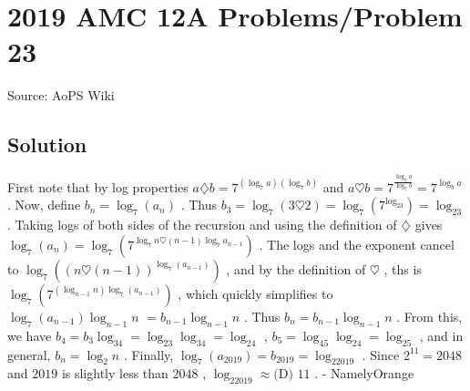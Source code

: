 \documentclass[12pt]{article}
\begin{document}
\section*{{2019 AMC 12A Problems/Problem 23}}
Source: AoPS Wiki

\subsection*{Solution}
First note that by log properties $a\diamondsuit b = 7^{(\log_7a)(\log_7b)}$ and $a \heartsuit b = 7^{\frac{\log_7a}{\log_7b}} = 7^{\log_ba}$ . Now, define $b_n = \log_7(a_n)$ . Thus $b_3 = \log_7(3\heartsuit 2) = \log_7(7^{\log_23}) = \log_23$ . Taking logs of both sides of the recursion and using the definition of $\diamondsuit$ gives $\log_7(a_n) = \log_7(7^{\log_7n\heartsuit (n-1)\log_7a_{n-1}})$ . The logs and the exponent cancel to $\log_7((n\heartsuit (n-1))^{\log_7(a_{n-1})})$ , and by the definition of $\heartsuit$ , ths is $\log_7(7^{(\log_{n-1}n)\log_7(a_{n-1})})$ , which quickly simplifies to $\log_7(a_{n-1})\log_{n-1}n$ $= b_{n-1}\log_{n-1}n$ . Thus $b_n = b_{n-1}\log_{n-1}n$ . From this, we have $b_4 = b_3\log_34 = \log_23\log_34 = \log_24$ , $b_5 = \log_45\log_24 = \log_25$ , and in general, $b_n = \log_2n$ . Finally, $\log_7(a_{2019}) = b_{2019}= \log_22019$ .
Since $2^{11} = 2048$ and $2019$ is slightly less than $2048$ , $\log_22019 \approx \boxed{\text{(D) }11}$ . - NamelyOrange
\end{document}
